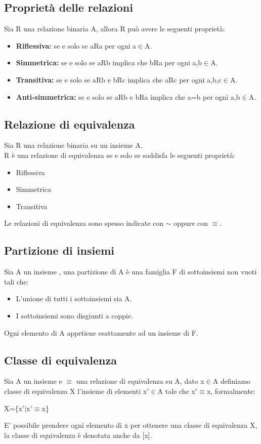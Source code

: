 \documentclass[../main.tex]{subfiles}
\begin{document}
    \subsection{Proprietà delle relazioni}
    Sia R una relazione binaria A, allora R può avere le seguenti proprietà:
    \begin{itemize}
        \item \textbf{Riflessiva:} se e solo se aRa per ogni a$\in$A.
        \item \textbf{Simmetrica:} se e solo se aRb implica che bRa per ogni a,b$\in$A.
        \item \textbf{Transitiva:} se e solo se aRb e bRc implica che aRc per ogni a,b,c$\in$A.
        \item \textbf{Anti-simmetrica:} se e solo se aRb e bRa implica che a=b per ogni a,b$\in$A.
    \end{itemize}

    \subsection{Relazione di equivalenza}
    Sia R una relazione binaria su un insieme A.\\
    R è una relazione di equivalenza se e solo se soddisfa le seguenti proprietà:
    \begin{itemize}
        \item Riflessiva
        \item Simmetrica
        \item Transitiva
    \end{itemize}
    Le relazioni di equivalenza sono spesso indicate con $\sim$ oppure con $\equiv$.

    \subsection{Partizione di insiemi}
    Sia A un insieme , una partizione di A è una famiglia F di sottoinsiemi non vuoti tali che:
    \begin{itemize}
        \item L'unione di tutti i sottoinsiemi sia A.
        \item I sottoinsiemi sono disgiunti a coppie.
    \end{itemize}
    Ogni elemento di A apprtiene esattamente ad un insieme di F.

    \subsection{Classe di equivalenza}
    Sia A un insieme e $\equiv$ una relazione di equivalenza su A, dato x$\in$A definiamo classe di equivalenza  X l'insieme di elementi x$\prime \in$A tale che x$\prime \equiv$x, formalmente:
    \begin{center}
        X=\{x$\prime | $x$\prime \equiv$x\}
    \end{center}
    E' possibile prendere ogni elemento di x per ottenere una classe di equivalenza X, la classe di equivalenza è denotata anche da [x].
\end{document}
